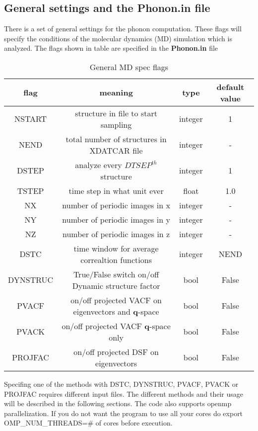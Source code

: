\documentclass[a4paper,12pt]{article}
\begin{document}
\subsection{General settings and the Phonon.in file}
There is a set of general settings for the phonon computation.
These flags will specify the conditions of the molecular dynamics (MD)
simulation which is analyzed.
The flags shown in table are specified in the \textbf{Phonon.in} file

\begin{table}[h!]
	\centering
	\caption{General MD spec flags}
\begin{tabular}{ |c|c|c|c| }
 \hline
	flag & meaning & type & default value \\ 
 \hline
	NSTART & structure in file to start sampling & integer & 1 \\  
	NEND   & total number of structures in XDATCAR file & integer & - \\
	DSTEP  & analyze every $DTSEP^{th}$ structure & integer & 1 \\
	TSTEP  & time step in what unit ever    & float & 1.0 \\
	NX     & number of periodic images in x & integer & - \\
	NY     & number of periodic images in y & integer & - \\
	NZ     & number of periodic images in z & integer & - \\
	DSTC   & time window for average correaltion functions & integer & NEND \\
	DYNSTRUC & True/False switch on/off Dynamic structure factor & bool & False\\
	PVACF   & on/off projected VACF on eigenvectors and $\mathbf{q}$-space & bool & False\\
	PVACK & on/off projected VACF $\mathbf{q}$-space only & bool & False\\
	PROJFAC & on/off projected DSF on eigenvectors & bool & False\\
 \hline
\end{tabular}
\end{table}

Specifing one of the methods with DSTC, DYNSTRUC, PVACF, PVACK or PROJFAC requires
different input files. The different methods and their usage will be described in the
following sections. The code also supports openmp parallelization. If you do not want
the program to use all your cores do export OMP\_NUM\_THREADS=\# of cores before execution.
\end{document}

